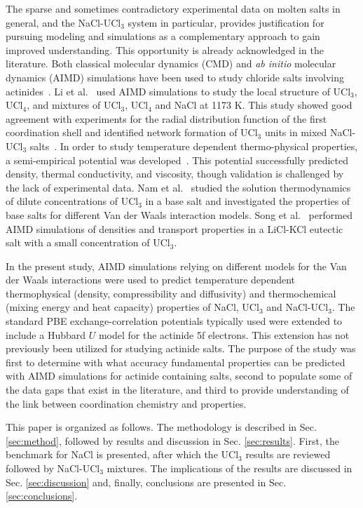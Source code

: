 \documentclass[preprint,3p,10pt,onecolumn,number,sort&compress]{elsarticle}
\begin{document}
The sparse and sometimes contradictory experimental data on molten salts in general, and the NaCl-UCl$_3$ system in particular, provides justification for pursuing modeling and simulations as a complementary approach to gain improved understanding. This opportunity is already acknowledged  in the literature. Both classical molecular dynamics (CMD) and \textit{ab initio} molecular dynamics (AIMD) simulations have been used to study chloride salts involving actinides~\cite{Li,Li2020,Nam2015,SONG}. Li et al.~\cite{Li} used AIMD simulations to study the local structure of UCl$_3$, UCl$_4$, and mixtures of UCl$_3$, UCl$_4$ and NaCl at 1173 K. This study showed good agreement with experiments for the radial distribution function of the first coordination shell and identified network formation of UCl$_3$ units in mixed NaCl-UCl$_3$ salts~\cite{Li}. %
In order to study temperature dependent thermo-physical properties, a semi-empirical potential was developed~\cite{Li2020}. This potential successfully predicted density, thermal conductivity, and viscosity, though validation is challenged by the lack of experimental data. Nam et al.~\cite{Nam2015} studied the solution thermodynamics of dilute concentrations of UCl$_3$ in a base salt and investigated the properties of base salts for different Van der Waals interaction models. Song et al.~\cite{SONG} performed AIMD simulations of densities and transport properties in a LiCl-KCl eutectic salt with a small concentration of UCl$_3$. 

In the present study, AIMD simulations relying on different models for the Van der Waals interactions were used to predict temperature dependent thermophysical (density, compressibility and diffusivity) and thermochemical (mixing energy and heat capacity) properties of NaCl, UCl$_3$ and NaCl-UCl$_3$. The standard PBE exchange-correlation potentials typically used were extended to include a Hubbard $U$ model for the actinide 5f electrons. This extension has not previously been utilized for studying actinide salts. The purpose of the study was first to determine with what accuracy fundamental properties can be predicted with AIMD simulations for actinide containing salts, second to populate some of the data gaps that exist in the literature, and third to provide understanding of the link between coordination chemistry and properties. 

This paper is organized as follows. The methodology is described in Sec. \ref{sec:method}, followed by results and discussion in Sec. \ref{sec:results}. First, the benchmark for NaCl is presented, after which the UCl$_3$ results are reviewed followed by NaCl-UCl$_3$ mixtures. The implications of the results are discussed in Sec. \ref{sec:discussion} and, finally, conclusions are presented in Sec. \ref{sec:conclusions}. 
\end{document}
